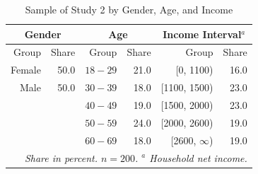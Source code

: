 \documentclass[egregdoesnotlikesansseriftitles]{scrartcl}
\begin{document}
\begin{table}[ht!]
\center
\caption{Sample of Study 2 by Gender, Age, and Income}
\label{tab:quota_study_2}
\begin{tabular}{rrrrrr}\\[0.5ex]
   \hline
   \multicolumn{2}{c}{Gender}   & \multicolumn{2}{c}{Age}   & \multicolumn{2}{c}{Income Interval$^a$}   \\
   \hline
   Group    & Share             & Group     & Share         & Group              & Share                \\
   \hline\hline
   Female   & 50.0              & $18-29$   & 21.0          &    [0, 1100)       & 16.0                 \\
   Male	    & 50.0              & $30-39$   & 18.0          & [1100, 1500)       & 23.0                 \\
            &                   & $40-49$   & 19.0          & [1500, 2000)       & 23.0                 \\
            &                   & $50-59$   & 24.0          & [2000, 2600)       & 19.0                 \\
            &                   & $60-69$   & 18.0          & [2600, $\infty$)   & 19.0                 \\
   \hline
   \multicolumn{6}{p{8cm}}{\footnotesize\textit{Share in percent. $n = 200$. $^a$ Household net income.}}
\end{tabular}
\end{table}
\end{document}
